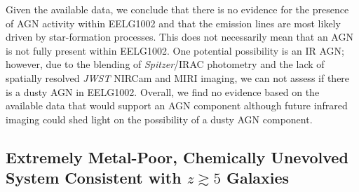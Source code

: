 \documentclass[twocolumn,tight,times,linenumbers]{aastex631}
\begin{document}
		Given the available data, we conclude that there is no evidence for the presence of AGN activity within EELG1002 and that the emission lines are most likely driven by star-formation processes. This does not necessarily mean that an AGN is not fully present within EELG1002. One potential possibility is an IR AGN; however, due to the blending of \textit{Spitzer}/IRAC photometry and the lack of spatially resolved \textit{JWST} NIRCam and MIRI imaging, we can not assess if there is a dusty AGN in EELG1002. Overall, we find no evidence based on the available data that would support an AGN component although future infrared imaging could shed light on the possibility of a dusty AGN component.


		\subsection{Extremely Metal-Poor, Chemically Unevolved System Consistent with $z \gtrsim 5$ Galaxies}
		\label{sec:metallicity}
\end{document}
